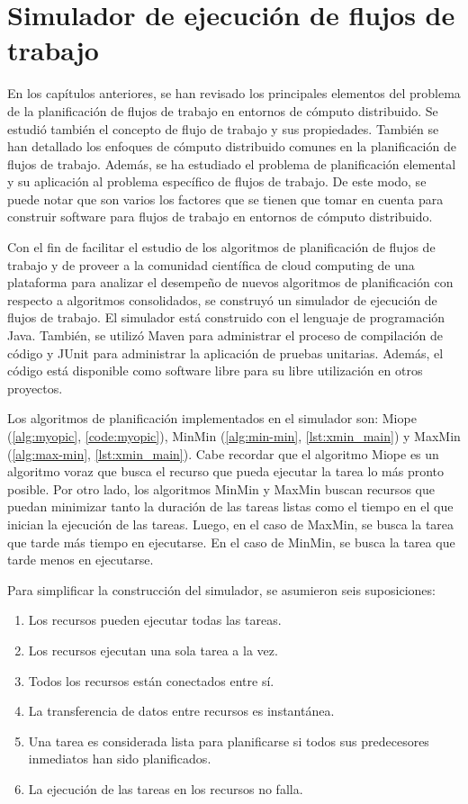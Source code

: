 \chapter[Simulador]{Simulador de ejecución de flujos de trabajo}

En los capítulos anteriores, se han revisado los principales elementos del problema de la planificación de flujos de trabajo en entornos de cómputo distribuido. Se estudió también el concepto de flujo de trabajo y sus propiedades. También se han detallado los enfoques de cómputo distribuido comunes en la planificación de flujos de trabajo. Además, se ha estudiado el problema de planificación elemental y su aplicación al problema específico de flujos de trabajo. De este modo, se puede notar que son varios los factores que se tienen que tomar en cuenta para construir software para flujos de trabajo en entornos de cómputo distribuido.

Con el fin de facilitar el estudio de los algoritmos de planificación de flujos de trabajo y de proveer a la comunidad científica de cloud computing de una plataforma para analizar el desempeño de nuevos algoritmos de planificación con respecto a algoritmos consolidados, se construyó un simulador de ejecución de flujos de trabajo. El simulador está construido con el lenguaje de programación Java. También, se utilizó Maven \cite{maven2014} para administrar el proceso de compilación de código y JUnit \cite{junit2014} para administrar la aplicación de pruebas unitarias. Además, el código está disponible como software libre \cite{dominofire2014workflowsimulator} para su libre utilización en otros proyectos.

Los algoritmos de planificación implementados en el simulador son: Miope (\ref{alg:myopic}, \ref{code:myopic}), MinMin (\ref{alg:min-min}, \ref{lst:xmin_main}) y MaxMin (\ref{alg:max-min}, \ref{lst:xmin_main}). Cabe recordar que el algoritmo Miope es un algoritmo voraz que busca el recurso que pueda ejecutar la tarea lo más pronto posible. Por otro lado, los algoritmos MinMin y MaxMin buscan recursos que puedan minimizar tanto la duración de las tareas listas como el tiempo en el que inician la ejecución de las tareas. Luego, en el caso de MaxMin, se busca la tarea que tarde más tiempo en ejecutarse. En el caso de MinMin, se busca la tarea que tarde menos en ejecutarse.

Para simplificar la construcción del simulador, se asumieron seis suposiciones:

\begin{enumerate}
\item Los recursos pueden ejecutar todas las tareas.
\item Los recursos ejecutan una sola tarea a la vez.
\item Todos los recursos están conectados entre sí.
\item La transferencia de datos entre recursos es instantánea.
\item Una tarea es considerada lista para planificarse si todos sus predecesores inmediatos han sido planificados.
\item La ejecución de las tareas en los recursos no falla.
\end{enumerate}

